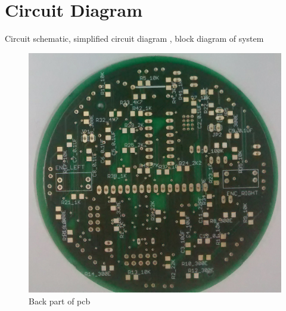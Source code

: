 \documentclass[a4paper,12pt,oneside]{book}
\begin{document}
\section{Circuit Diagram}
Circuit schematic, simplified circuit diagram , block diagram of system
\hfill\\
\begin{figure}[h!]
	\caption{Back part of pcb}
	\includegraphics[width=\textwidth]{./Pictures/PCB_back}		
\end{figure}	
\hfill\\
\end{document}
